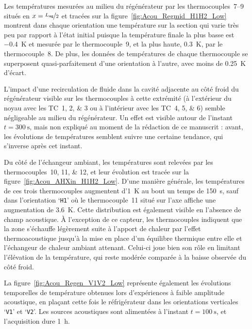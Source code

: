 Les températures mesurées au milieu du régénérateur par les thermocouples~\numrange{7}{9} situés en $x=\nicefrac{L_{\sf reg}}{2}$ et tracées sur la figure~\ref{fig:Acou_Regmid_H1H2_Low} montrent dans chaque orientation une température sur la section qui varie très peu par rapport à l'état initial puisque la température finale la plus basse est \qty{-.4}{\kelvin} et mesurée par le thermocouple~\num{9}, et la plus haute, \qty{.3}{\kelvin}, par le thermocouple~\num{8}. De plus, les données de températures de chaque thermocouple se superposent quasi-parfaitement d'une orientation à l'autre, avec moins de \qty{.25}{\kelvin} d'écart.

L'impact d'une recirculation de fluide dans la cavité adjacente au côté froid du régénérateur visible sur les thermocouples à cette extrémité (à l'extérieur du noyau avec les TC~\numlist{1;2;3} ou à l'intérieur avec les TC~\numlist{4;5;6}) semble négligeable au milieu du régénérateur. Un effet est visible autour de l'instant $t=\qty{300}{\second}$, mais non expliqué au moment de la rédaction de ce manuscrit : avant, les évolutions de températures semblent suivre une certaine tendance, qui s'inverse après cet instant.\medskip

Du côté de l'échangeur ambiant, les températures sont relevées par les thermocouples~\numlist{10;11;12}, et leur évolution est tracée sur la figure~\ref{fig:Acou_AHXin_H1H2_Low}. D'une manière générale, les températures de ces trois thermocouples augmentent d'\qty{1}{\kelvin} au bout un temps de \qty{150}{\second}, sauf dans l'orientation `\texttt{H1}' où le thermocouple~\num{11} situé sur l'axe affiche une augmentation de \qty{3.6}{\kelvin}. Cette distribution est également visible en l'absence de champ acoustique. À l'exception de ce capteur, les thermocouples indiquent que la zone s'échauffe légèrement suite à l'apport de chaleur par l'effet thermoacoustique jusqu'à la mise en place d'un équilibre thermique entre elle et l'échangeur de chaleur ambiant attenant. Celui-ci joue bien son rôle en limitant l'élévation de la température, qui reste modérée comparée à la baisse observée du côté froid.\bigskip



La figure~\ref{fig:Acou_Regen_V1V2_Low} représente également les évolutions temporelles de température obtenues lors d'expériences à faible amplitude acoustique, en plaçant cette fois le réfrigérateur dans les orientations verticales `\texttt{V1}' et `\texttt{V2}'. Les sources acoustiques sont alimentées à l'instant $t=\qty{100}{\second}$, et l'acquisition dure \qty{1}{\hour}.\medskip

